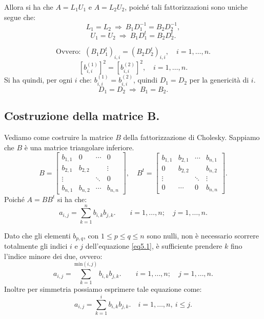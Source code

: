 \begin{dimo}
Allora si ha che $A = L_1U_1$ e $A = L_2U_2$, poiché tali fattorizzazioni
sono uniche segue che:
\[L_1 = L_2 \ \Rightarrow \ B_1D_1^{-1} = B_2D_2^{-1},\]
\[U_1 = U_2 \ \Rightarrow \ B_1D_1^{t} = B_2D_2^{t}.\]

\[\textrm{Ovvero: }\ \left(B_1D_1^{t}\right)_{i,i} =
\left(B_2D_2^{t}\right)_{i,i}, \quad i = 1, \ldots, n.\]
\[
\left[b_{i,i}^{(1)}\right]^2 = \left[b_{i,i}^{(2)}\right]^2,\quad i= 1, \ldots, n.
\]
Si ha quindi, per ogni $i$ che: $b_{i,i}^{(1)} = b_{i,i}^{(2)}$,
quindi $D_1 = D_2$ per la genericità di $i$.
\[D_1 = D_2\ \Rightarrow \ B_1 = B_2.\]
\end{dimo}

\subsection{Costruzione della matrice B.}
Vediamo come costruire la matrice $B$ della fattorizzazione di Cholesky.
Sappiamo che $B$ è una matrice triangolare inferiore.
\[ B =
\left[
\begin{array}{cccc}
b_{1,1} & 0 & \cdots & 0 \\
b_{2,1} & b_{2,2} & & \vdots \\
\vdots & & \ddots & 0 \\
b_{n,1} & b_{n,2}& \cdots  & b_{n,n}
\end{array}
\right], \quad
B^t =
\left[
\begin{array}{cccc}
b_{1,1} & b_{2,1} & \cdots & b_{n,1} \\
0 & b_{2,2} & & b_{n,2} \\
\vdots & & \ddots & \vdots \\
0 & \cdots & 0  & b_{n,n}
\end{array}
\right].
\]
Poiché $A = BB^t$ si ha che:
\begin{equation}\label{eq5.1}
a_{i,j} = \sum_{k = 1}^{n} b_{i,k}b_{j,k}. \qquad i = 1, \ldots, n; \quad j =1,
\ldots, n.
\end{equation}

\begin{notabene}
Dato che gli elementi $b_{p,q}$, con $1 \leq p \leq q \leq n$ sono nulli, non
è necessario scorrere totalmente gli indici $i$ e $j$ dell'equazione
\ref{eq5.1}, è sufficiente prendere $k$ fino l'indice minore dei due, ovvero:
\[
a_{i,j} = \sum_{k = 1}^{\textrm{min}(i,j)} b_{i,k}b_{j,k}. \qquad i = 1, \ldots, n;
\quad j =1,\ldots, n.
\]
Inoltre per simmetria possiamo esprimere tale equazione come:
\begin{equation}\label{eq5.2}
a_{i,j} = \sum_{k = 1}^{i} b_{i,k}b_{j,k}. \quad i = 1, \ldots, n, \ i \leq j.
\end{equation}
\end{notabene}

